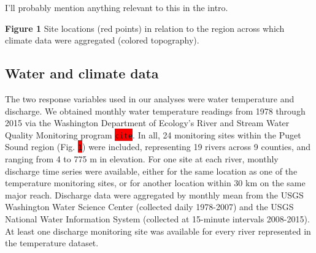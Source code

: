 \documentclass{article}
\begin{document}
I'll probably mention anything relevant to this in the intro.

\begin{center}
\textbf{Figure 1} Site locations (red points) in relation to the region across which climate data were aggregated (colored topography).
\end{center}

\subsection*{Water and climate data}

The two response variables used in our analyses were water temperature and discharge. We obtained monthly water temperature readings from 1978 through 2015 via the Washington Department of Ecology's River and Stream Water Quality Monitoring program \colorbox{red}{\lstinline{cite}}. In all, 24 monitoring sites within the Puget Sound region (Fig. \colorbox{red}{\lstinline{1}}) were included, representing 19 rivers across 9 counties, and ranging from 4 to 775 m in elevation. For one site at each river, monthly discharge time series were available, either for the same location as one of the temperature monitoring sites, or for another location within 30 km on the same major reach. Discharge data were aggregated by monthly mean from the USGS Washington Water Science Center (collected daily 1978-2007) and the USGS National Water Information System (collected at 15-minute intervals 2008-2015). At least one discharge monitoring site was available for every river represented in the temperature dataset.
\end{document}
